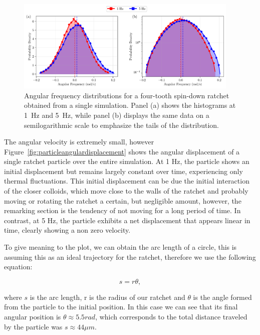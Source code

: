 \begin{figure}[h!]
  \begin{center}
    \includegraphics[width=0.95\textwidth]{figures/histogram_comparison.pdf}
  \end{center}
  \caption[Histogram of angular frequency.]{Angular frequency distributions for a four-tooth spin-down ratchet obtained from a single simulation. Panel (a) shows the histograms at 1~Hz and 5~Hz, while panel (b) displays the same data on a semilogarithmic scale to emphasize the tails of the distribution.}
  \label{fig:histogram}
\end{figure}

The angular velocity is extremely small, however Figure~\ref{fig:particleangulardisplacement} shows the angular displacement of a single ratchet particle over the entire simulation. At 1 Hz, the particle shows an initial displacement but remains largely constant over time, experiencing only thermal fluctuations. This initial displacement can be due the initial interaction of the closer colloids, which move close to the walls of the ratchet and probably moving or rotating the ratchet a certain, but negligible amount, however, the remarking section is the tendency of not moving for a long period of time. In contrast, at 5 Hz, the particle exhibits a net displacement that appears linear in time, clearly showing a non zero velocity.

To give meaning to the plot, we can obtain the arc length of a circle, this is assuming this as an ideal trajectory for the ratchet, therefore we use the following equation:

\begin{equation*}
  s = r\theta,
  \label{eq:arclength}
\end{equation*}

where $s$ is the arc length, r is the radius of our ratchet and $\theta$ is the angle formed from the particle to the initial position.
In this case we can see that its final angular position is $\theta \approx 5.5 rad$, which corresponds to the total distance traveled by the particle was $s \approx 44 \mu m$.

